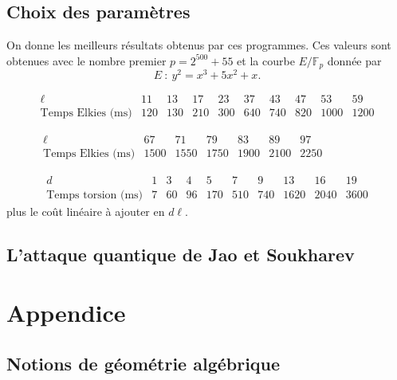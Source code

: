 \documentclass[11pt,a4paper]{article}
\newcommand{\F}{\mathbb{F}}
\theoremstyle{definition}
\begin{document}
\subsection{Choix des paramètres}

On donne les meilleurs résultats obtenus par ces programmes. Ces valeurs sont obtenues avec le nombre premier $ p = 2^{500} + 55$ et la courbe $E/\F_p$ donnée par
$$E\ :\ y^2 = x^3 + 5x^2 + x.$$

$$\begin{matrix}
\ell & 11 & 13 & 17 & 23 & 37 & 43 & 47 & 53 & 59 \\
\text{Temps\ Elkies\ (ms)} & 120 & 130 & 210 & 300 & 640 & 740 & 820 & 1000 & 1200 
\end{matrix}$$

$$\begin{matrix}
\ell & 67 & 71 & 79 & 83 & 89 & 97 &\qquad & &\\
\text{Temps\ Elkies\ (ms)} & 1500 & 1550 & 1750 & 1900 & 2100 & 2250 & & &
\end{matrix}$$

$$\begin{matrix}
d & 1 & 3 & 4 & 5 & 7 & 9 & 13 & 16 & 19\\
\text{Temps\ torsion\ (ms)} & 7 & 60 & 96 & 170 & 510 & 740 & 1620 & 2040 & 3600
\end{matrix}$$
plus le coût linéaire à ajouter en $d\ell$.
\newpage

\subsection{L'attaque quantique de Jao et Soukharev}

\section{Appendice}

\subsection{Notions de géométrie algébrique}



\newpage





\end{document}
